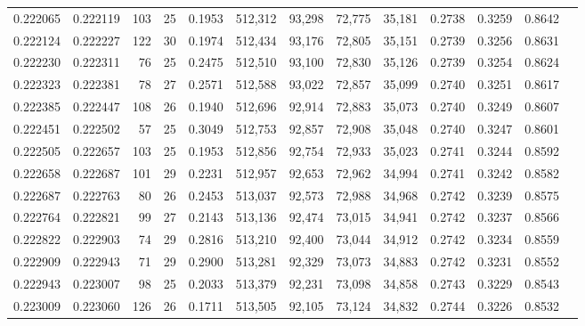 \begin{tabular}{rrrrrrrrrrrrr}
0.222065 & 0.222119 & 103 &  25 &                                     0.1953 & 512,312 &  93,298 &  72,775 &  35,181 & 0.2738 & 0.3259 & 0.8642 \\
0.222124 & 0.222227 & 122 &  30 &                                     0.1974 & 512,434 &  93,176 &  72,805 &  35,151 & 0.2739 & 0.3256 & 0.8631 \\
0.222230 & 0.222311 &  76 &  25 &                                     0.2475 & 512,510 &  93,100 &  72,830 &  35,126 & 0.2739 & 0.3254 & 0.8624 \\
0.222323 & 0.222381 &  78 &  27 &                                     0.2571 & 512,588 &  93,022 &  72,857 &  35,099 & 0.2740 & 0.3251 & 0.8617 \\
0.222385 & 0.222447 & 108 &  26 &                                     0.1940 & 512,696 &  92,914 &  72,883 &  35,073 & 0.2740 & 0.3249 & 0.8607 \\
0.222451 & 0.222502 &  57 &  25 &                                     0.3049 & 512,753 &  92,857 &  72,908 &  35,048 & 0.2740 & 0.3247 & 0.8601 \\
0.222505 & 0.222657 & 103 &  25 &                                     0.1953 & 512,856 &  92,754 &  72,933 &  35,023 & 0.2741 & 0.3244 & 0.8592 \\
0.222658 & 0.222687 & 101 &  29 &                                     0.2231 & 512,957 &  92,653 &  72,962 &  34,994 & 0.2741 & 0.3242 & 0.8582 \\
0.222687 & 0.222763 &  80 &  26 &                                     0.2453 & 513,037 &  92,573 &  72,988 &  34,968 & 0.2742 & 0.3239 & 0.8575 \\
0.222764 & 0.222821 &  99 &  27 &                                     0.2143 & 513,136 &  92,474 &  73,015 &  34,941 & 0.2742 & 0.3237 & 0.8566 \\
0.222822 & 0.222903 &  74 &  29 &                                     0.2816 & 513,210 &  92,400 &  73,044 &  34,912 & 0.2742 & 0.3234 & 0.8559 \\
0.222909 & 0.222943 &  71 &  29 &                                     0.2900 & 513,281 &  92,329 &  73,073 &  34,883 & 0.2742 & 0.3231 & 0.8552 \\
0.222943 & 0.223007 &  98 &  25 &                                     0.2033 & 513,379 &  92,231 &  73,098 &  34,858 & 0.2743 & 0.3229 & 0.8543 \\
0.223009 & 0.223060 & 126 &  26 &                                     0.1711 & 513,505 &  92,105 &  73,124 &  34,832 & 0.2744 & 0.3226 & 0.8532 \\

\end{tabular}
